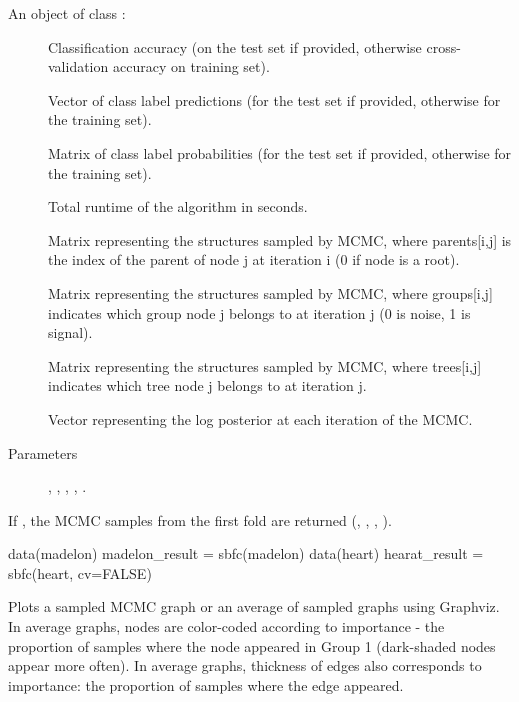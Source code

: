 \documentclass[a4paper]{book}
\begin{document}
\begin{Value}
An object of class :
\begin{description}
     
\item[] Classification accuracy (on the test set if provided, otherwise cross-validation accuracy on training set).
\item[] Vector of class label predictions (for the test set if provided, otherwise for the training set).
\item[] Matrix of class label probabilities (for the test set if provided, otherwise for the training set).
\item[] Total runtime of the algorithm in seconds.
\item[] Matrix representing the structures sampled by MCMC, where parents[i,j] is the index of the parent of node j at iteration i (0 if node is a root).
\item[] Matrix representing the structures sampled by MCMC, where groups[i,j] indicates which group node j belongs to at iteration j (0 is noise, 1 is signal).
\item[] Matrix representing the structures sampled by MCMC, where trees[i,j] indicates which tree node j belongs to at iteration j.
\item[] Vector representing the log posterior at each iteration of the MCMC.
\item[Parameters] , , , , .

\end{description}

If , the MCMC samples from the first fold are returned (, , , ).
\end{Value}
%
\begin{Examples}
\begin{ExampleCode}
data(madelon)
madelon_result = sbfc(madelon)
data(heart)
hearat_result = sbfc(heart, cv=FALSE)
\end{ExampleCode}
\end{Examples}
%
\begin{Description}\relax
Plots a sampled MCMC graph or an average of sampled graphs using Graphviz. \\{}
In average graphs, nodes are color-coded according to importance - the proportion of samples where the node appeared in Group 1 (dark-shaded nodes appear more often).
In average graphs, thickness of edges also corresponds to importance: the proportion of samples where the edge appeared.
\end{Description}
\end{document}
